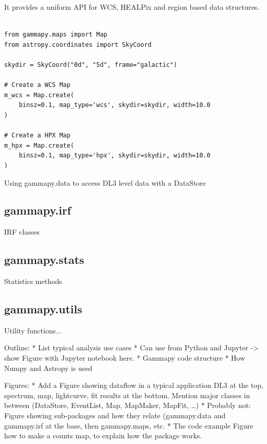It provides a uniform API for WCS, HEALPix and region based data structures.

\begin{listing}
\begin{verbatim}

from gammapy.maps import Map
from astropy.coordinates import SkyCoord

skydir = SkyCoord("0d", "5d", frame="galactic")

# Create a WCS Map
m_wcs = Map.create(
	binsz=0.1, map_type='wcs', skydir=skydir, width=10.0
)

# Create a HPX Map
m_hpx = Map.create(
	binsz=0.1, map_type='hpx', skydir=skydir, width=10.0
)

\end{verbatim}
\caption{Using gammapy.data to access DL3 level data with a DataStore}
\label{codeexample:data}
\end{listing}


\subsection{gammapy.irf}
IRF classes

\subsection{gammapy.stats}
Statistics methods


\subsection{gammapy.utils}
Utility functions...


Outline:
* List typical analysis use cases
* Can use from Python and Jupyter -> show Figure with Jupyter notebook here.
* Gammapy code structure
* How Numpy and Astropy is used


Figures:
* Add a Figure showing dataflow in a typical application
DL3 at the top, spectrum, map, lightcurve, fit results at the bottom.
Mention major classes in between (DataStore, EventList, Map, MapMaker, MapFit, …)
* Probably not: Figure showing sub-packages and how they relate (gammapy.data and gammapy.irf at the base, then gammapy.maps, etc.
* The code example Figure how to make a counts map, to explain how the package works.
